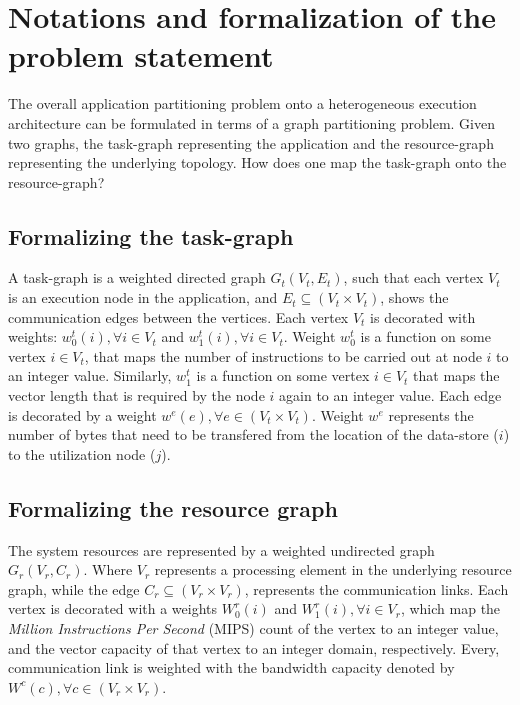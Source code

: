 \section{Notations and formalization of the problem statement}
\label{sec:relat-notat-form}

The overall application partitioning problem onto a heterogeneous
execution architecture can be formulated in terms of a graph
partitioning problem. Given two graphs, the task-graph representing the
application and the resource-graph representing the underlying
topology. How does one map the task-graph onto the resource-graph?


\subsection{Formalizing the task-graph}
\label{sec:form-task-graph}

A task-graph is a weighted directed graph $G_t(V_t,E_t)$, such that each
vertex $V_t$ is an execution node in the application, and \mbox{$E_t
  \subseteq (V_t \times V_t)$}, shows the communication edges between
the vertices. Each vertex $V_t$ is decorated with weights: $w^t_0(i),
\forall i \in V_t$ and $w^t_1(i), \forall i \in V_t$. Weight $w^t_0$ is
a function on some vertex $i \in V_t$, that maps the number of
instructions to be carried out at node $i$ to an integer
value. Similarly, $w^t_1$ is a function on some vertex $i \in V_t$ that
maps the vector length that is required by the node $i$ again to an
integer value. Each edge is decorated by a weight $w^e(e), \forall e \in
(V_t \times V_t)$. Weight $w^e$ represents the number of bytes that need
to be transfered from the location of the data-store ($i$) to the
utilization node ($j$).


\subsection{Formalizing the resource graph}
\label{sec:form-reso-graph}

The system resources are represented by a weighted undirected graph
$G_r(V_r,C_r)$. Where $V_r$ represents a processing element in the
underlying resource graph, while the edge $C_r \subseteq (V_r \times
V_r)$, represents the communication links. Each vertex is decorated with
a weights $W^r_0(i)$ and $W^r_1(i), \forall i \in V_r$, which map the
\textit{Million Instructions Per Second} (MIPS) count of the vertex to
an integer value, and the vector capacity of that vertex to an integer
domain, respectively. Every, communication link is weighted with the
bandwidth capacity denoted by $W^c(c), \forall c \in (V_r \times V_r)$.

